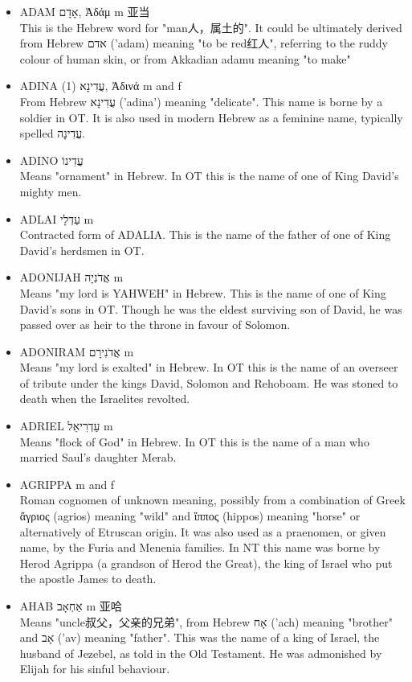 \begin{itemize}
\item {ADAM אָדָם, Ἀδάμ m 亚当}\\
This is the Hebrew word for "man人，属土的". It could be ultimately derived from Hebrew אדם ('adam) meaning "to be red红人", referring to the ruddy colour of human skin, or from Akkadian adamu meaning "to make" 
\item {ADINA (1) עֲדִינָא, Ἀδινά m and f}\\
From Hebrew עֲדִינָא ('adina') meaning "delicate". This name is borne by a soldier in OT. It is also used in modern Hebrew as a feminine name, typically spelled עֲדִינָה.
\item {ADINO עֲדִינוֹ}\\
Means "ornament" in Hebrew. In OT this is the name of one of King David's mighty men.
\item {ADLAI עַדְלָי m}\\
Contracted form of ADALIA. This is the name of the father of one of King David's herdsmen in OT.
\item {ADONIJAH אֲדֹנִיָה m}\\
Means "my lord is YAHWEH" in Hebrew. This is the name of one of King David's sons in OT. Though he was the eldest surviving son of David, he was passed over as heir to the throne in favour of Solomon.
\item {ADONIRAM אֲדֹנִירָם m}\\
Means "my lord is exalted" in Hebrew. In OT this is the name of an overseer of tribute under the kings David, Solomon and Rehoboam. He was stoned to death when the Israelites revolted.
\item {ADRIEL עַדְרִיאֵל m}\\
Means "flock of God" in Hebrew. In OT this is the name of a man who married Saul's daughter Merab.
\item {AGRIPPA m and f}\\
Roman cognomen of unknown meaning, possibly from a combination of Greek ἄγριος (agrios) meaning "wild" and ἵππος (hippos) meaning "horse" or alternatively of Etruscan origin. It was also used as a praenomen, or given name, by the Furia and Menenia families. In NT this name was borne by Herod Agrippa (a grandson of Herod the Great), the king of Israel who put the apostle James to death. 
\item {AHAB אַחְאָב m 亚哈}\\
Means "uncle叔父，父亲的兄弟", from Hebrew אָח ('ach) meaning "brother" and אָב ('av) meaning "father". This was the name of a king of Israel, the husband of Jezebel, as told in the Old Testament. He was admonished by Elijah for his sinful behaviour. 

\end{itemize}
